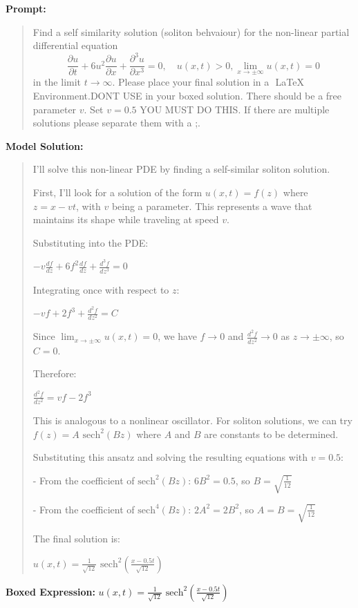 \documentclass{article}
\begin{document}
\textbf{Prompt:}
\begin{quote}
Find a self similarity solution (soliton behvaiour) for the non-linear partial differential equation $$ \frac{\partial u}{\partial t} + 6 u^2 \frac{\partial u}{\partial x} + \frac{\partial^3 u}{\partial x^3} = 0, \quad u(x, t) > 0, \lim_{x \to \pm \infty} u(x,t) = 0 $$ in the limit $t \rightarrow \infty $. Please place your final solution in a $\boxed{}$ LaTeX Environment.DONT USE \operatorname in your boxed solution. There should be a free parameter $v$. Set $v=0.5$ YOU MUST DO THIS. If there are multiple solutions please separate them with a ;.
\end{quote}
\textbf{Model Solution:}
\begin{quote}
I'll solve this non-linear PDE by finding a self-similar soliton solution.



First, I'll look for a solution of the form $u(x,t) = f(z)$ where $z = x - vt$, with $v$ being a parameter. This represents a wave that maintains its shape while traveling at speed $v$.



Substituting into the PDE:

$-v\frac{df}{dz} + 6f^2\frac{df}{dz} + \frac{d^3f}{dz^3} = 0$



Integrating once with respect to $z$:

$-vf + 2f^3 + \frac{d^2f}{dz^2} = C$



Since $\lim_{x \to \pm \infty} u(x,t) = 0$, we have $f \to 0$ and $\frac{d^2f}{dz^2} \to 0$ as $z \to \pm\infty$, so $C = 0$.



Therefore:

$\frac{d^2f}{dz^2} = vf - 2f^3$



This is analogous to a nonlinear oscillator. For soliton solutions, we can try $f(z) = A\text{ sech}^2(Bz)$ where $A$ and $B$ are constants to be determined.



Substituting this ansatz and solving the resulting equations with $v = 0.5$:

- From the coefficient of $\text{sech}^2(Bz)$: $6B^2 = 0.5$, so $B = \sqrt{\frac{1}{12}}$

- From the coefficient of $\text{sech}^4(Bz)$: $2A^2 = 2B^2$, so $A = B = \sqrt{\frac{1}{12}}$



The final solution is:



$\boxed{u(x,t) = \frac{1}{\sqrt{12}}\text{ sech}^2\left(\frac{x-0.5t}{\sqrt{12}}\right)}$
\end{quote}
\textbf{Boxed Expression:} $u(x,t) = \frac{1}{\sqrt{12}}\text{ sech}^2\left(\frac{x-0.5t}{\sqrt{12}}\right)$
\end{document}
